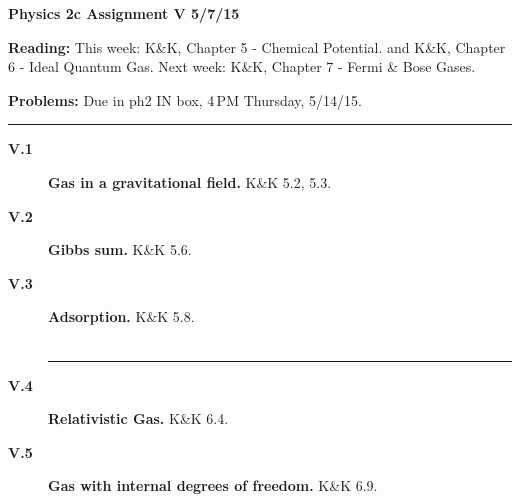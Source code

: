 \documentclass[11pt]{article}
\def\hb{\hfill\break}
\begin{document}
%
\centerline{\large\bf Physics 2c \hfill Assignment V \hfill  5/7/15}

\medskip
\begin{list}{}{\leftmargin 2.4cm  .2cm }
\item[{\bf Reading:}  \hfill ] This week: K\&K, Chapter 5 - Chemical Potential. \hb
                               and        K\&K, Chapter 6 - Ideal Quantum Gas. \hb
                               Next week: K\&K, Chapter 7 - Fermi \& Bose Gases.
\item[{\bf Problems:} \hfill ] Due in ph2 IN box, 4\,PM  Thursday, 5/14/15.
\end{list}

\hrule

\begin{description}
\item[{\bf V.1} ] {\bf Gas in a gravitational field.} K\&K 5.2, 5.3.

\item[{\bf V.2} ] {\bf Gibbs sum.} K\&K 5.6.

\item[{\bf V.3} ] {\bf Adsorption.} K\&K 5.8.\\
\\
\hrule

\item[{\bf V.4}] {\bf Relativistic Gas.} K\&K 6.4.

\item[{\bf V.5}] {\bf Gas with internal degrees of freedom.} K\&K 6.9.


\end{description}
\end{document}
